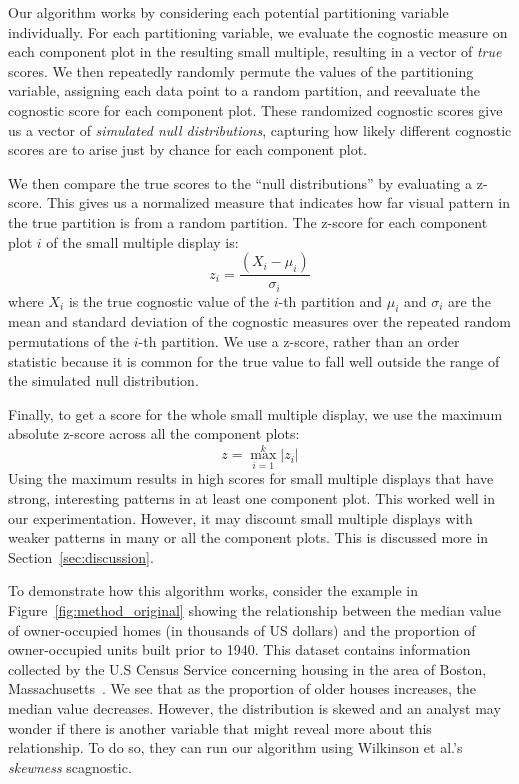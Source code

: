 Our algorithm works by considering each potential partitioning variable individually. For each partitioning variable, we evaluate the cognostic measure on each component plot in the resulting small multiple, resulting in a vector of \emph{true} scores. We then repeatedly randomly permute the values of the partitioning variable, assigning each data point to a random partition, and reevaluate the cognostic score for each component plot. These randomized cognostic scores give us a vector of \emph{simulated null distributions}, capturing how likely different cognostic scores are to arise just by chance for each component plot.

We then compare the true scores to the ``null distributions'' by evaluating a z-score. This gives us a normalized measure that indicates how far visual pattern in the true partition is from a random partition. The z-score for each component plot $i$ of the small multiple display is:
$$z_i = \frac{(X_i-\mu_i)}{\sigma_i}$$ 
where $X_i$ is the true cognostic value of the $i$-th partition and $\mu_i$ and $\sigma_i$ are the mean and standard deviation of the cognostic measures over the repeated random permutations of the $i$-th partition. We use a z-score, rather than an order statistic because it is common for the true value to fall well outside the range of the simulated null distribution.

Finally, to get a score for the whole small multiple display, we use the maximum absolute z-score across all the component plots: 
$$z = \max_{i=1}^k |z_i|$$
Using the maximum results in high scores for small multiple displays that have strong, interesting patterns in at least one component plot. This worked well in our experimentation. However, it may discount small multiple displays with weaker patterns in many or all the component plots. This is discussed more in Section~\ref{sec:discussion}. 

To demonstrate how this algorithm works, consider the example in Figure~\ref{fig:method_original} showing the relationship between the median value of owner-occupied homes (in thousands of US dollars) and the proportion of owner-occupied units built prior to 1940. This dataset contains information collected by the U.S Census Service concerning housing in the area of Boston, Massachusetts~\cite{Harrison1978}. We see that as the proportion of older houses increases, the median value decreases. However, the distribution is skewed and an analyst may wonder if there is another variable that might reveal more about this relationship.
To do so, they can run our algorithm using Wilkinson et al.'s \emph{skewness} scagnostic.

